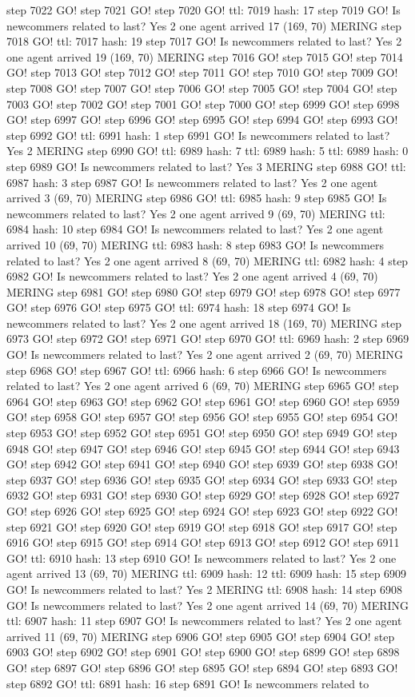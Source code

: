 step 7022 GO! step 7021 GO! step 7020 GO! ttl: 7019 hash: 17 step 7019 GO! Is newcommers related to last? Yes 2 one agent arrived 17 (169, 70) MERING step 7018 GO! ttl: 7017 hash: 19 step 7017 GO! Is newcommers related to last? Yes 2 one agent arrived 19 (169, 70) MERING step 7016 GO! step 7015 GO! step 7014 GO! step 7013 GO! step 7012 GO! step 7011 GO! step 7010 GO! step 7009 GO! step 7008 GO! step 7007 GO! step 7006 GO! step 7005 GO! step 7004 GO! step 7003 GO! step 7002 GO! step 7001 GO! step 7000 GO! step 6999 GO! step 6998 GO! step 6997 GO! step 6996 GO! step 6995 GO! step 6994 GO! step 6993 GO! step 6992 GO! ttl: 6991 hash: 1 step 6991 GO! Is newcommers related to last? Yes 2 MERING step 6990 GO! ttl: 6989 hash: 7 ttl: 6989 hash: 5 ttl: 6989 hash: 0 step 6989 GO! Is newcommers related to last? Yes 3 MERING step 6988 GO! ttl: 6987 hash: 3 step 6987 GO! Is newcommers related to last? Yes 2 one agent arrived 3 (69, 70) MERING step 6986 GO! ttl: 6985 hash: 9 step 6985 GO! Is newcommers related to last? Yes 2 one agent arrived 9 (69, 70) MERING ttl: 6984 hash: 10 step 6984 GO! Is newcommers related to last? Yes 2 one agent arrived 10 (69, 70) MERING ttl: 6983 hash: 8 step 6983 GO! Is newcommers related to last? Yes 2 one agent arrived 8 (69, 70) MERING ttl: 6982 hash: 4 step 6982 GO! Is newcommers related to last? Yes 2 one agent arrived 4 (69, 70) MERING step 6981 GO! step 6980 GO! step 6979 GO! step 6978 GO! step 6977 GO! step 6976 GO! step 6975 GO! ttl: 6974 hash: 18 step 6974 GO! Is newcommers related to last? Yes 2 one agent arrived 18 (169, 70) MERING step 6973 GO! step 6972 GO! step 6971 GO! step 6970 GO! ttl: 6969 hash: 2 step 6969 GO! Is newcommers related to last? Yes 2 one agent arrived 2 (69, 70) MERING step 6968 GO! step 6967 GO! ttl: 6966 hash: 6 step 6966 GO! Is newcommers related to last? Yes 2 one agent arrived 6 (69, 70) MERING step 6965 GO! step 6964 GO! step 6963 GO! step 6962 GO! step 6961 GO! step 6960 GO! step 6959 GO! step 6958 GO! step 6957 GO! step 6956 GO! step 6955 GO! step 6954 GO! step 6953 GO! step 6952 GO! step 6951 GO! step 6950 GO! step 6949 GO! step 6948 GO! step 6947 GO! step 6946 GO! step 6945 GO! step 6944 GO! step 6943 GO! step 6942 GO! step 6941 GO! step 6940 GO! step 6939 GO! step 6938 GO! step 6937 GO! step 6936 GO! step 6935 GO! step 6934 GO! step 6933 GO! step 6932 GO! step 6931 GO! step 6930 GO! step 6929 GO! step 6928 GO! step 6927 GO! step 6926 GO! step 6925 GO! step 6924 GO! step 6923 GO! step 6922 GO! step 6921 GO! step 6920 GO! step 6919 GO! step 6918 GO! step 6917 GO! step 6916 GO! step 6915 GO! step 6914 GO! step 6913 GO! step 6912 GO! step 6911 GO! ttl: 6910 hash: 13 step 6910 GO! Is newcommers related to last? Yes 2 one agent arrived 13 (69, 70) MERING ttl: 6909 hash: 12 ttl: 6909 hash: 15 step 6909 GO! Is newcommers related to last? Yes 2 MERING ttl: 6908 hash: 14 step 6908 GO! Is newcommers related to last? Yes 2 one agent arrived 14 (69, 70) MERING ttl: 6907 hash: 11 step 6907 GO! Is newcommers related to last? Yes 2 one agent arrived 11 (69, 70) MERING step 6906 GO! step 6905 GO! step 6904 GO! step 6903 GO! step 6902 GO! step 6901 GO! step 6900 GO! step 6899 GO! step 6898 GO! step 6897 GO! step 6896 GO! step 6895 GO! step 6894 GO! step 6893 GO! step 6892 GO! ttl: 6891 hash: 16 step 6891 GO! Is newcommers related to 